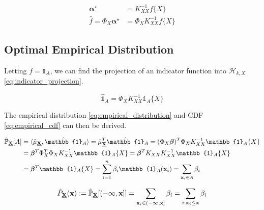 \documentclass[twoside]{article} \usepackage{aistats2017}
\theoremstyle{definition}
\theoremstyle{remark}
\newcommand{\rv}[1]{\underline{#1}}
\newcommand{\ds}[1]{{#1}}
\begin{document}
		\begin{equation}
			\begin{aligned}
				\bm{\alpha}^{\star} &= K_{\ds{X} \ds{X}}^{-1} f\{\ds{X}\} \\
				\hat{f} = \Phi_{\ds{X}} \bm{\alpha}^{\star} &= \Phi_{\ds{X}} K_{\ds{X} \ds{X}}^{-1} f\{\ds{X}\}
			\end{aligned}
		\label{eq:function_projection_solution}
		\end{equation}
		
	\subsection{Optimal Empirical Distribution}
	\label{sec:discriminative_quantile_regression:optimal_empirical_distribution}
	
		Letting $f = \mathbb{1}_{A}$, we can find the projection of an indicator function into $\mathcal{H}_{k, \ds{X}}$ \eqref{eq:indicator_projection}.
		
		\begin{equation}
			\hat{\mathbb{1}}_{A} = \Phi_{\ds{X}} K_{\ds{X} \ds{X}}^{-1} \mathbb{1}_{A}\{\ds{X}\}
		\label{eq:indicator_projection}
		\end{equation}
		
		The empirical distribution \eqref{eq:empirical_distribution} and CDF \eqref{eq:empirical_cdf} can then be derived.

		\begin{equation}
		\begin{aligned}
			\hat{\mathbb{P}}_{\bvec{\rv{X}}}[A] &= \langle \hat{\mu}_{\bvec{\rv{X}}}, \hat{\mathbb{1}}_{A} \rangle = \hat{\mu}_{\bvec{\rv{X}}}^{T}\hat{\mathbb{1}}_{A} = (\Phi_{\ds{X}} \bm{\beta})^{T} \Phi_{\ds{X}} K_{\ds{X} \ds{X}}^{-1} \mathbb{1}_{A}\{\ds{X}\} \\
			&= \bm{\beta}^{T} \Phi_{\ds{X}}^{T} \Phi_{\ds{X}} K_{\ds{X} \ds{X}}^{-1} \mathbb{1}_{A}\{\ds{X}\} = \bm{\beta}^{T} K_{\ds{X} \ds{X}} K_{\ds{X} \ds{X}}^{-1} \mathbb{1}_{A}\{\ds{X}\} \\
			&= \bm{\beta}^{T} \mathbb{1}_{A}\{\ds{X}\} = \sum_{i = 1}^{n} \beta_{i} \mathbb{1}_{A}(\bvec{x}_{i}) = \sum_{\bvec{x}_{i} \in A} \beta_{i}
		\end{aligned}
		\label{eq:empirical_distribution}
		\end{equation}

		\begin{equation}
			\hat{P}_{\bvec{\rv{X}}}(\bvec{x}) := \hat{\mathbb{P}}_{\bvec{\rv{X}}}[(-\bvec{\infty}, \bvec{x}]] = \sum_{\bvec{x}_{i} \in (-\bvec{\infty}, \bvec{x}]} \beta_{i} = \sum_{i : \bvec{x}_{i} \leq \bvec{x}} \beta_{i}
		\label{eq:empirical_cdf}
		\end{equation}
\end{document}
